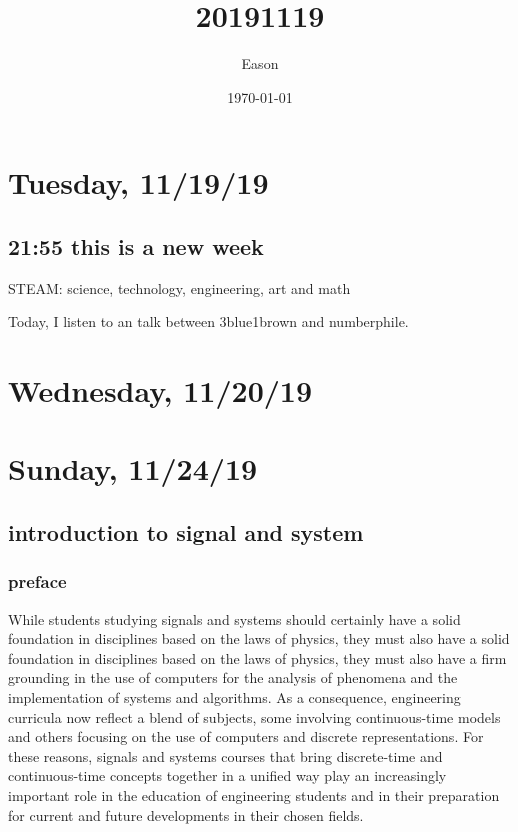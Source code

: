 \documentclass[koma,utopia,letterpaper,captions=tableheading,11pt,listings-sv,microtype,paralist,colorlinks=true,urlcolor=blue]{org-article}
\author{Eason}
\date{\today}
\title{20191119}
\begin{document}
\maketitle
\tableofcontents

\section{Tuesday, 11/19/19}
\label{sec:orgaf7c73e}
\subsection{21:55 this is a new week}
\label{sec:org784f7a1}
STEAM: science, technology, engineering, art and math

Today, I listen to an talk between 3blue1brown and numberphile.

\section{Wednesday, 11/20/19}
\label{sec:org7da6c22}

\section{Sunday, 11/24/19}
\label{sec:org9fb7c83}
\subsection{introduction to signal and system}
\label{sec:org4132682}
\subsubsection{preface}
\label{sec:org30a21fe}


While students studying signals and systems should certainly have a solid
foundation in disciplines based on the laws of physics, they must also have a
solid foundation in disciplines based on the laws of physics, they must also
have a firm grounding in the use of computers for the analysis of phenomena
and the implementation of systems and algorithms. As a consequence, engineering
curricula now reflect a blend of subjects, some involving continuous-time models
and others focusing on the use of computers and discrete representations. For
these reasons, signals and systems courses that bring discrete-time and
continuous-time concepts together in a unified way play an increasingly
important role in the education of engineering students and in their preparation
for current and future developments in their chosen fields.
\end{document}
